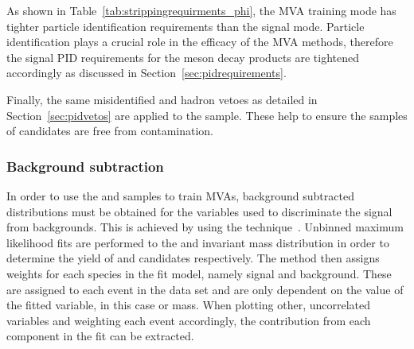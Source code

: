 As shown in Table~\ref{tab:strippingrequirments_phi}, the MVA training mode has tighter particle identification requirements than the signal mode. Particle identification plays a crucial role in the efficacy of the MVA methods, therefore the signal PID requirements for the \phiz meson decay products are tightened accordingly as discussed in Section~\ref{sec:pidrequirements}.

Finally, the same misidentified \D and \Lc hadron vetoes as detailed in Section~\ref{sec:pidvetos} are applied to the \decay{\Bsb}{\Dsp\pim} sample. These help to ensure the samples of \Dsp candidates are free from contamination.


\subsubsection{Background subtraction}

In order to use the \decay{\Bs}{\jpsi\phiz} and \decay{\Bsb}{\Dsp\pim} samples to train MVAs, background subtracted distributions must be obtained for the variables used to discriminate the signal from backgrounds. This is achieved by using the \sPlot technique~\cite{Pivk:2004ty}. Unbinned maximum likelihood fits are performed to the \Dsp and \phiz invariant mass distribution in order to determine the yield of \Dsp and \phiz candidates respectively. The \sPlot method then assigns weights for each species in the fit model, namely signal and background. These are assigned to each event in the data set and are only dependent on the value of the fitted variable, in this case \phiz or \Dsp mass. When plotting other, uncorrelated variables and weighting each event accordingly, the contribution from each component in the fit can be extracted. 

